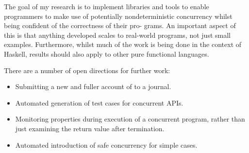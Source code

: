 The goal of my research is to implement libraries and tools to enable
programmers to make use of potentially nondeterministic concurrency
whilst being confident of the correctness of their pro- grams. An
important aspect of this is that anything developed scales to
real-world programs, not just small examples. Furthermore, whilst much
of the work is being done in the context of Haskell, results should
also apply to other pure functional languages.

There are a number of open directions for further work:

\begin{itemize}
\item Submitting a new and fuller account of \dejafu{} to a journal.

\item Automated generation of test cases for concurrent APIs.

\item Monitoring properties during execution of a concurrent program,
  rather than just examining the return value after termination.

\item Automated introduction of safe concurrency for simple cases.
\end{itemize}
